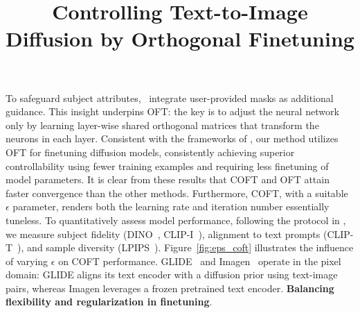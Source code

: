 \title{Controlling Text-to-Image Diffusion by Orthogonal Finetuning}
To safeguard subject attributes,~\cite{avrahami2022blended,nichol2022glide} integrate user-provided masks as additional guidance. This insight underpins OFT: the key is to adjust the neural network only by learning layer-wise shared orthogonal matrices that transform the neurons in each layer. Consistent with the frameworks of \cite{zhang2023adding,mou2023t2i}, our method utilizes OFT for finetuning diffusion models, consistently achieving superior controllability using fewer training examples and requiring less finetuning of model parameters. It is clear from these results that COFT and OFT attain faster convergence than the other methods. Furthermore, COFT, with a suitable $\epsilon$ parameter, renders both the learning rate and iteration number essentially tuneless. To quantitatively assess model performance, following the protocol in \cite{ruiz2023dreambooth}, we measure subject fidelity (DINO~\cite{caron2021emerging}, CLIP-I~\cite{radford2021learning}), alignment to text prompts (CLIP-T~\cite{radford2021learning}), and sample diversity (LPIPS~\cite{zhang2018unreasonable}). Figure~\ref{fig:eps_coft} illustrates the influence of varying $\epsilon$ on COFT performance. GLIDE~\cite{nichol2022glide} and Imagen~\cite{saharia2022photorealistic} operate in the pixel domain: GLIDE aligns its text encoder with a diffusion prior using text-image pairs, whereas Imagen leverages a frozen pretrained text encoder. \textbf{Balancing flexibility and regularization in finetuning}. 
